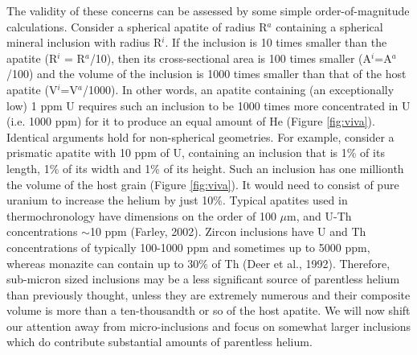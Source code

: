 \documentclass{article}
\begin{document}
The  validity  of  these  concerns  can be  assessed  by  some  simple
order-of-magnitude  calculations.   Consider  a spherical  apatite  of
radius  R$^a$ containing  a  spherical mineral  inclusion with  radius
R$^i$. If the inclusion is 10  times smaller than the apatite (R$^i$ =
R$^a$/10),  then  its  cross-sectional   area  is  100  times  smaller
(A$^i$=A$^a$/100)  and  the volume  of  the  inclusion  is 1000  times
smaller than  that of the  host apatite (V$^i$=V$^a$/1000).   In other
words, an apatite  containing (an exceptionally low) 1  ppm U requires
such an inclusion to be 1000  times more concentrated in U (i.e.  1000
ppm) for it to produce an  equal amount of He (Figure \ref{fig:viva}). 
Identical arguments  hold for non-spherical  geometries.  For example,
consider a prismatic apatite with 10 ppm of U, containing an inclusion
that is  1\% of its length,  1\% of its width  and 1\% of  its height. 
Such  an inclusion  has one  millionth the  volume of  the  host grain
(Figure \ref{fig:viva}).  It would need  to consist of pure uranium to
increase  the   helium  by  just  10\%.   Typical   apatites  used  in
thermochronology have dimensions on the  order of 100 $\mu$m, and U-Th
concentrations $\sim$10 ppm (Farley,  2002).  Zircon inclusions have U
and Th  concentrations of typically  100-1000 ppm and sometimes  up to
5000 ppm, whereas monazite can contain  up to 30\% of Th (Deer et al.,
1992).   Therefore,   sub-micron  sized  inclusions  may   be  a  less
significant  source  of  parentless  helium than  previously  thought,
unless they are extremely numerous  and their composite volume is more
than a  ten-thousandth or so of  the host apatite.  We  will now shift
our attention away from  micro-inclusions and focus on somewhat larger
inclusions  which  do  contribute  substantial amounts  of  parentless
helium.
\end{document}

